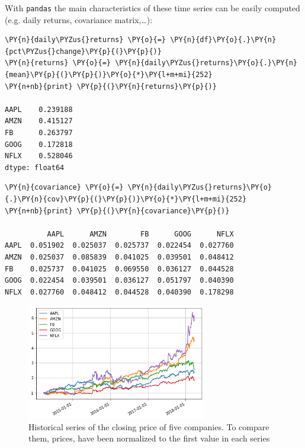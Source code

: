 With \texttt{pandas} the main characteristics of these time series can
be easily computed (e.g. daily returns, covariance matrix,\ldots):

\begin{tcolorbox}[breakable, size=fbox, boxrule=1pt, pad at break*=1mm,colback=cellbackground, colframe=cellborder]
\begin{Verbatim}[commandchars=\\\{\}]
\PY{n}{daily\PYZus{}returns} \PY{o}{=} \PY{n}{df}\PY{o}{.}\PY{n}{pct\PYZus{}change}\PY{p}{(}\PY{p}{)}
\PY{n}{returns} \PY{o}{=} \PY{n}{daily\PYZus{}returns}\PY{o}{.}\PY{n}{mean}\PY{p}{(}\PY{p}{)}\PY{o}{*}\PY{l+m+mi}{252}
\PY{n+nb}{print} \PY{p}{(}\PY{n}{returns}\PY{p}{)}

AAPL    0.239188
AMZN    0.415127
FB      0.263797
GOOG    0.172818
NFLX    0.528046
dtype: float64
\end{Verbatim}
\end{tcolorbox}

\begin{tcolorbox}[breakable, size=fbox, boxrule=1pt, pad at break*=1mm,colback=cellbackground, colframe=cellborder]
\begin{Verbatim}[commandchars=\\\{\}]
\PY{n}{covariance} \PY{o}{=} \PY{n}{daily\PYZus{}returns}\PY{o}{.}\PY{n}{cov}\PY{p}{(}\PY{p}{)}\PY{o}{*}\PY{l+m+mi}{252}
\PY{n+nb}{print} \PY{p}{(}\PY{n}{covariance}\PY{p}{)}

          AAPL      AMZN        FB      GOOG      NFLX
AAPL  0.051902  0.025037  0.025737  0.022454  0.027760
AMZN  0.025037  0.085839  0.041025  0.039501  0.048412
FB    0.025737  0.041025  0.069550  0.036127  0.044528
GOOG  0.022454  0.039501  0.036127  0.051797  0.040390
NFLX  0.027760  0.048412  0.044528  0.040390  0.178298
\end{Verbatim}
\end{tcolorbox}

\begin{figure}[htb]
\centering
\includegraphics[width=0.7\textwidth]{figures/portfolio_sample}
\caption{Historical series of the closing price of five companies. To compare them, prices, have been normalized to the 
first value in each series}
\label{fig:stocks}
\end{figure}
    
